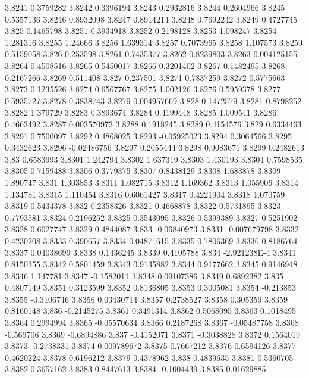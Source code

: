 3.8241  0.3759282
3.8242  0.3396194
3.8243  0.2932816
3.8244  0.2604966
3.8245  0.5357136
3.8246  0.8932098
3.8247  0.8914214
3.8248  0.7692242
3.8249  0.4727745
3.825  0.1465798
3.8251  0.3934918
3.8252  0.2198128
3.8253  1.098247
3.8254  1.281316
3.8255  1.24666
3.8256  1.639314
3.8257  0.7073965
3.8258  1.107573
3.8259  0.5159058
3.826  0.253598
3.8261  0.7435377
3.8262  0.8239803
3.8263  0.004125155
3.8264  0.4508516
3.8265  0.5450017
3.8266  0.3201402
3.8267  0.1482495
3.8268  0.2167266
3.8269  0.511408
3.827  0.237501
3.8271  0.7837259
3.8272  0.5775663
3.8273  0.1235526
3.8274  0.6567767
3.8275  1.002126
3.8276  0.5959378
3.8277  0.5935727
3.8278  0.3838743
3.8279  0.004957669
3.828  0.1472579
3.8281  0.8798252
3.8282  1.379729
3.8283  0.3893674
3.8284  0.4199448
3.8285  1.009541
3.8286  0.4663492
3.8287  0.003570973
3.8288  0.1918245
3.8289  0.4154576
3.829  0.6334463
3.8291  0.7500097
3.8292  0.4868025
3.8293  -0.05925023
3.8294  0.3064566
3.8295  0.3432623
3.8296  -0.02486756
3.8297  0.2055444
3.8298  0.9083671
3.8299  0.2482613
3.83  0.6583993
3.8301  1.242794
3.8302  1.637319
3.8303  1.430193
3.8304  0.7598535
3.8305  0.7159488
3.8306  0.3779375
3.8307  0.8438129
3.8308  1.683878
3.8309  1.890747
3.831  1.303853
3.8311  1.082715
3.8312  1.169362
3.8313  1.055906
3.8314  1.134781
3.8315  1.110454
3.8316  0.6061427
3.8317  0.4221904
3.8318  1.070759
3.8319  0.5434378
3.832  0.2358326
3.8321  0.4668878
3.8322  0.5731895
3.8323  0.7793581
3.8324  0.2196252
3.8325  0.3543095
3.8326  0.5399389
3.8327  0.5251902
3.8328  0.6027747
3.8329  0.4844087
3.833  -0.06840973
3.8331  -0.007679798
3.8332  0.4230208
3.8333  0.390657
3.8334  0.04871615
3.8335  0.7806369
3.8336  0.8186764
3.8337  0.04038699
3.8338  0.1436245
3.8339  0.4105788
3.834  -2.921238E-4
3.8341  0.8150355
3.8342  0.5801459
3.8343  0.9135882
3.8344  0.9177662
3.8345  0.9146948
3.8346  1.147781
3.8347  -0.1582011
3.8348  0.09107386
3.8349  0.6892382
3.835  0.4807149
3.8351  0.3123599
3.8352  0.8136805
3.8353  0.3005081
3.8354  -0.213853
3.8355  -0.3106746
3.8356  0.03430714
3.8357  0.2738527
3.8358  0.305359
3.8359  0.8160148
3.836  -0.2145275
3.8361  0.3491314
3.8362  0.5068095
3.8363  0.1018495
3.8364  0.2994994
3.8365  -0.05570634
3.8366  0.2187268
3.8367  -0.05487758
3.8368  -0.569706
3.8369  -0.6894886
3.837  -0.4152071
3.8371  -0.3038828
3.8372  0.1564019
3.8373  -0.2738331
3.8374  0.009789672
3.8375  0.7667212
3.8376  0.6594126
3.8377  0.4620224
3.8378  0.6196212
3.8379  0.4378962
3.838  0.4839635
3.8381  0.5360705
3.8382  0.3657162
3.8383  0.8447613
3.8384  -0.1004439
3.8385  0.01629885
